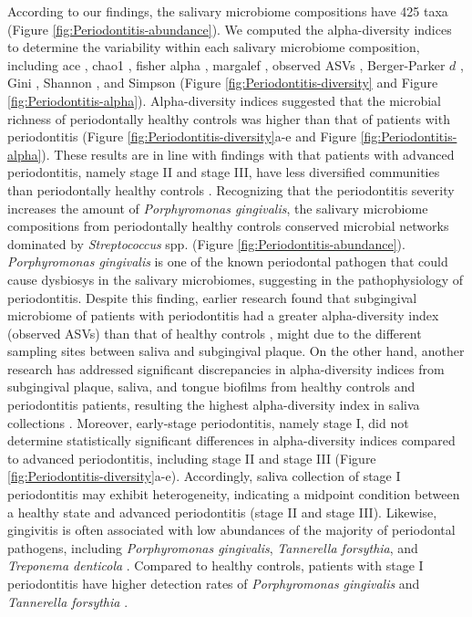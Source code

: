 \documentclass[11pt, a4paper, onecolumn, oneside]{report}
\begin{document}
            According to our findings, the salivary microbiome compositions have 425 taxa (Figure \ref{fig:Periodontitis-abundance}). We computed the alpha-diversity indices to determine the variability within each salivary microbiome composition, including ace \cite{ACE-1}, chao1 \cite{chao1-1}, fisher alpha \cite{fisher-1}, margalef \cite{margalef-1}, observed ASVs \cite{observed-ASVs-1}, Berger-Parker $d$ \cite{Berger-1}, Gini \cite{Gini-1}, Shannon \cite{Shannon-1}, and Simpson \cite{Simpson-1} (Figure \ref{fig:Periodontitis-diversity} and Figure \ref{fig:Periodontitis-alpha}). Alpha-diversity indices suggested that the microbial richness of periodontally healthy controls was higher than that of patients with periodontitis (Figure \ref{fig:Periodontitis-diversity}a-e and Figure \ref{fig:Periodontitis-alpha}). These results are in line with findings with that patients with advanced periodontitis, namely stage II and stage III, have less diversified communities than periodontally healthy controls \cite{Periodontitis-18}. Recognizing that the periodontitis severity increases the amount of \textit{Porphyromonas gingivalis}, the salivary microbiome compositions from periodontally healthy controls conserved microbial networks dominated by \textit{Streptococcus} spp. (Figure \ref{fig:Periodontitis-abundance}). \textit{Porphyromonas gingivalis} is one of the known periodontal pathogen that could cause dysbiosys in the salivary microbiomes, suggesting in the pathophysiology of periodontitis. Despite this finding, earlier research found that subgingival microbiome of patients with periodontitis had a greater alpha-diversity index (observed ASVs) than that of healthy controls \cite{Periodontitis-10}, might due to the different sampling sites between saliva and subgingival plaque. On the other hand, another research has addressed significant discrepancies in alpha-diversity indices from subgingival plaque, saliva, and tongue biofilms from healthy controls and periodontitis patients, resulting the highest alpha-diversity index in saliva collections \cite{Periodontitis-19}. Moreover, early-stage periodontitis, namely stage I, did not determine statistically significant differences in alpha-diversity indices compared to advanced periodontitis, including stage II and stage III (Figure \ref{fig:Periodontitis-diversity}a-e). Accordingly, saliva collection of stage I periodontitis may exhibit heterogeneity, indicating a midpoint condition between a healthy state and advanced periodontitis (stage II and stage III). Likewise, gingivitis is often associated with low abundances of the majority of periodontal pathogens, including \textit{Porphyromonas gingivalis}, \textit{Tannerella forsythia}, and \textit{Treponema denticola} \cite{Periodontitis-7}. Compared to healthy controls, patients with stage I periodontitis have higher detection rates of \textit{Porphyromonas gingivalis} and \textit{Tannerella forsythia} \cite{Periodontitis-20, Periodontitis-21}.
\end{document}
